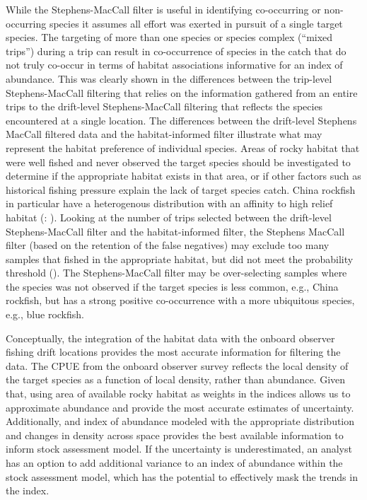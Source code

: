 \documentclass[
  12pt,
  authoryear,
  preprint,
  3p]{elsarticle}
\begin{document}
While the Stephens-MacCall filter is useful in identifying co-occurring
or non-occurring species it assumes all effort was exerted in pursuit of
a single target species. The targeting of more than one species or
species complex (``mixed trips'') during a trip can result in
co-occurrence of species in the catch that do not truly co-occur in
terms of habitat associations informative for an index of abundance.
This was clearly shown in the differences between the trip-level
Stephens-MacCall filtering that relies on the information gathered from
an entire trips to the drift-level Stephens-MacCall filtering that
reflects the species encountered at a single location. The differences
between the drift-level Stephens MacCall filtered data and the
habitat-informed filter illustrate what may represent the habitat
preference of individual species. Areas of rocky habitat that were well
fished and never observed the target species should be investigated to
determine if the appropriate habitat exists in that area, or if other
factors such as historical fishing pressure explain the lack of target
species catch. China rockfish in particular have a heterogenous
distribution with an affinity to high relief habitat (\citet{Love}: ).
Looking at the number of trips selected between the drift-level
Stephens-MacCall filter and the habitat-informed filter, the Stephens
MacCall filter (based on the retention of the false negatives) may
exclude too many samples that fished in the appropriate habitat, but did
not meet the probability threshold (\citet{tbl:samplesize}). The
Stephens-MacCall filter may be over-selecting samples where the species
was not observed if the target species is less common, e.g., China
rockfish, but has a strong positive co-occurrence with a more ubiquitous
species, e.g., blue rockfish.

Conceptually, the integration of the habitat data with the onboard
observer fishing drift locations provides the most accurate information
for filtering the data. The CPUE from the onboard observer survey
reflects the local density of the target species as a function of local
density, rather than abundance. Given that, using area of available
rocky habitat as weights in the indices allows us to approximate
abundance and provide the most accurate estimates of uncertainty.
Additionally, and index of abundance modeled with the appropriate
distribution and changes in density across space provides the best
available information to inform stock assessment model. If the
uncertainty is underestimated, an analyst has an option to add
additional variance to an index of abundance within the stock assessment
model, which has the potential to effectively mask the trends in the
index.
\end{document}
